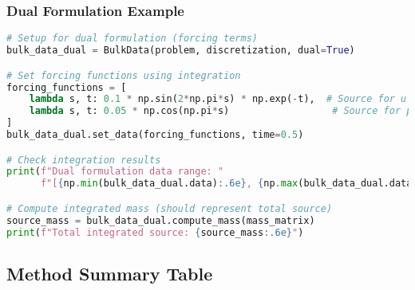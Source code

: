 \subsubsection{Dual Formulation Example}

\begin{lstlisting}[language=Python, caption=Complete Dual Usage Example]
# Setup for dual formulation (forcing terms)
bulk_data_dual = BulkData(problem, discretization, dual=True)

# Set forcing functions using integration
forcing_functions = [
    lambda s, t: 0.1 * np.sin(2*np.pi*s) * np.exp(-t),  # Source for u
    lambda s, t: 0.05 * np.cos(np.pi*s)                  # Source for phi
]
bulk_data_dual.set_data(forcing_functions, time=0.5)

# Check integration results
print(f"Dual formulation data range: "
      f"[{np.min(bulk_data_dual.data):.6e}, {np.max(bulk_data_dual.data):.6e}]")

# Compute integrated mass (should represent total source)
source_mass = bulk_data_dual.compute_mass(mass_matrix)
print(f"Total integrated source: {source_mass:.6e}")
\end{lstlisting}

\subsection{Method Summary Table}
\label{subsec:bulk_data_method_summary}

